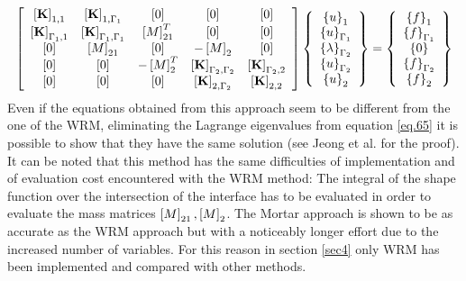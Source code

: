\begin{equation}
\label{eq.65}
 \left[ \begin{array}{ccccc} 
    \left[{\mathbf{K}}\right]_{1,1} & \left[{\mathbf{K}}\right]_{1,\Gamma_1} &\left[{0}\right] &\left[{0}\right]& \left[{0}\right] \\
   \left[{\mathbf{K}}\right]_{\Gamma_1,1} & \left[{\mathbf{K}}\right]_{\Gamma_1,\Gamma_1} &\left[{M}\right]_{21}^T & \left[{0}\right]& \left[{0}\right]\\ \left[{0}\right] &\left[{M}\right]_{21} &\left[{0}\right] &-\left[{M}\right]_{2}& \left[{0}\right]\\\left[{0}\right]& \left[{0}\right]& -\left[{M}\right]_{2}^T & \left[{\mathbf{K}}\right]_{\Gamma_2,\Gamma_2} &\left[{\mathbf{K}}\right]_{\Gamma_2,2}\\   
    \left[{0}\right] & \left[{0}\right]&\left[{0}\right]& \left[{\mathbf{K}}\right]_{2,\Gamma_2} & \left[{\mathbf{K}}\right]_{2,2}\end{array} \right]\left\lbrace\begin{array}{c} \left\lbrace{u}\right \rbrace_1\\\left\lbrace{u}\right \rbrace_{\Gamma_1}\\\left\lbrace{\lambda}\right \rbrace_{\Gamma_2}\\\left\lbrace{u}\right \rbrace_{\Gamma_2}\\\left\lbrace{u}\right \rbrace_2
    \end{array}\right\rbrace=\left\lbrace\begin{array}{c} \left\lbrace{f}\right \rbrace_1\\\left\lbrace{f}\right \rbrace_{\Gamma_1}\\\left\lbrace{0}\right \rbrace\\\left\lbrace{f}\right \rbrace_{\Gamma_2}\\\left\lbrace{f}\right \rbrace_2
    \end{array}\right\rbrace
\end{equation}
Even if the equations obtained from this approach seem to be different from the one of the WRM, eliminating the Lagrange eigenvalues from equation \eqref{eq.65} it is possible to show that they have the same solution (see Jeong et al. \cite{jeong2017element} for the proof). It can be noted that this method has the same difficulties of implementation and of evaluation cost encountered with the WRM method: The integral of the shape function over the intersection of the interface has to be evaluated in order to evaluate the mass matrices $\left[{M}\right]_{21},\left[{M}\right]_{2}$. The Mortar approach is shown to be as accurate as the WRM approach but with a noticeably longer effort due to the increased number of variables. For this reason in section \ref{sec4} only WRM has been implemented and compared with other methods.
